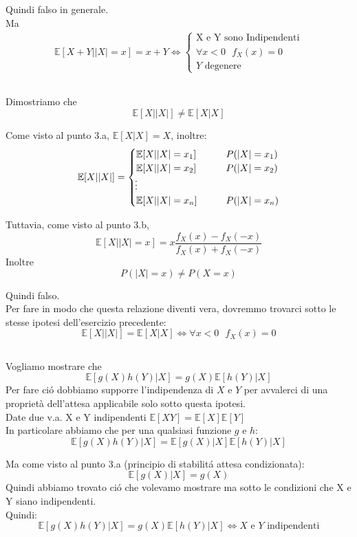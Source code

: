 \documentclass[a4paper]{article}
\newcommand{\E}[0]{\mathbb{E}}
\begin{document}
Quindi falso in generale. \\
Ma 
\begin{align*}
\E[X + Y | |X| = x] = x + Y \iff
	\begin{cases}
        \text{X e Y sono Indipendenti} \\
        \forall x < 0  \ \ \  f_X(x) = 0 \\
        Y \text{ degenere}
	\end{cases}
\end{align*}


\subsection{}
Dimostriamo che 
$$
\E[X||X|] \ne \E[X | X] 
$$

Come visto al punto 3.a,  $\E[X | X] = X$, inoltre:
\begin{align}
	\E[X | |X|]=
	\begin{cases}
		\E[X | |X| = x_1] \qquad & P(|X|=x_1)\\
		\E[X | |X| = x_2] \qquad & P(|X|=x_2)\\
        \vdotswithin{} \notag \\
		\E[X | |X| = x_n] \qquad & P(|X|=x_n)\\
	\end{cases}
\end{align}

Tuttavia, come visto al punto 3.b, 
$$\E[X | |X| = x] = x\frac{f_X(x)-f_X(-x)}{f_X(x) + f_X(-x)}$$
Inoltre
$$P(|X| = x) \ne P(X = x)$$

Quindi falso. \\ 
Per fare in modo che questa relazione diventi vera, dovremmo trovarci sotto le stesse ipotesi dell'esercizio precedente:
$$
\E[X||X|] = \E[X | X] \iff \forall x<0 \ \ \ f_X(x) = 0
$$

\subsection{}
Vogliamo mostrare che
$$\E[g(X)h(Y) | X] = g(X)\E[h(Y) | X]$$
Per fare ció dobbiamo supporre l'indipendenza di $X$ e $Y$ per avvalerci di una proprietà dell'attesa applicabile solo sotto questa ipotesi.\\
Date due v.a. X e Y indipendenti $\E[XY]= \E[X]\E[Y]$\\
In particolare abbiamo che per una qualsiasi funzione $g$ e $h$:
$$\E[g(X)h(Y) | X] = \E[g(X) | X] \E[h(Y) | X]$$

Ma come visto al punto 3.a (principio di stabilitá attesa condizionata):
$$
\E[g(X) | X] = g(X)
$$
Quindi abbiamo trovato ció che volevamo mostrare ma sotto le condizioni che X e Y siano indipendenti. \\
Quindi:
$$
\E[g(X)h(Y) | X] = g(X)\E[h(Y) | X] \iff X \text{ e } Y \text{ indipendenti}
$$
\end{document}
